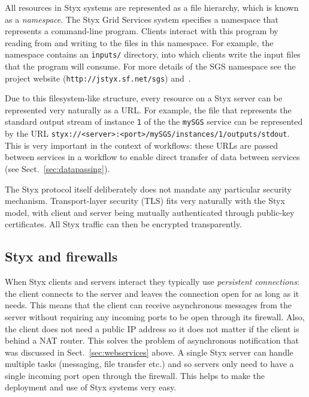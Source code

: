 \documentclass{llncs}
\begin{document}
All resources in Styx systems are represented as a file hierarchy, which is known as a {\em namespace\/}.  The Styx Grid Services system specifies a namespace that represents a command-line program.  Clients interact with this program by reading from and writing to the files in this namespace.  For example, the namespace contains an {\tt inputs/} directory, into which clients write the input files that the program will consume.  For more details of the SGS namespace see the project website ({\tt http://jstyx.sf.net/sgs}) and~\cite{blower:2005}.

Due to this filesystem-like structure, every resource on a Styx server can be represented very naturally as a URL.  For example, the file that represents the standard output stream of instance {\tt 1} of the the {\tt mySGS} service can be represented by the URL {\tt styx://<server>:<port>/mySGS/instances/1/outputs/stdout}.  This is very important in the context of workflows: these URLs are passed between services in a workflow to enable direct transfer of data between services (see Sect.~\ref{sec:datapassing}).

The Styx protocol itself deliberately does not mandate any particular security mechanism.  Transport-layer security (TLS) fits very naturally with the Styx model, with client and server being mutually authenticated through public-key certificates.  All Styx traffic can then be encrypted transparently.

\subsection{Styx and firewalls}\label{sec:styx-firewalls}
When Styx clients and servers interact they typically use {\em persistent connections\/}: the client connects to the server and leaves the connection open for as long as it needs.  This means that the client can receive asynchronous messages from the server without requiring any incoming ports to be open through its firewall.  Also, the client does not need a public IP address so it does not matter if the client is behind a NAT router.  This solves the problem of asynchronous notification that was discussed in Sect.~\ref{sec:webservices} above.  A single Styx server can handle multiple tasks (messaging, file transfer etc.) and so servers only need to have a single incoming port open through the firewall.  This helps to make the deployment and use of Styx systems very easy.
\end{document}
